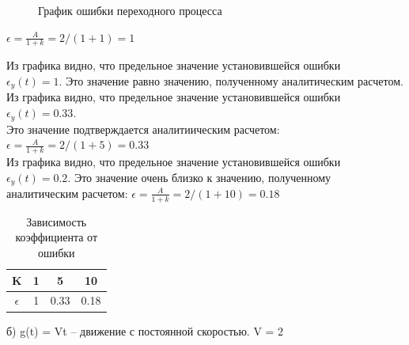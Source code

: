 \documentclass[a4paper, 11pt]{article}
\begin{document}
\begin{figure}[h!]
    \caption{График ошибки переходного процесса}
    \label{tree}
\end{figure}



\large{$\epsilon=\frac {A}{1+k} = 2/(1+1) = 1$}

Из графика видно, что предельное значение установившейся ошибки \\ $\epsilon_y(t) = 1$. Это значение равно значению, полученному аналитическим расчетом.\\

Из графика видно, что предельное значение установившейся ошибки $\epsilon_y(t)=0.33$.\\
Это значение подтверждается аналитиическим расчетом: $\epsilon=\frac {A}{1+k} = 2/(1+5) = 0.33$\\



Из графика видно, что предельное значение установившейся ошибки $\epsilon_y(t)=0.2$.
Это значение очень близко к значению, полученному аналитическим расчетом: $\epsilon=\frac {A}{1+k} = 2/(1+10) = 0.18$

\begin{table}[h]
    \begin{center}
   	\caption{Зависимость коэффициента от ошибки}
    \begin{tabular}{|c|c|c|c|}
    \hline
         K & 1 & 5 & 10 \\
         \hline
         $\epsilon$ & 1 & 0.33 & 0.18 \\
    \hline     
    \end{tabular}

    \label{tab:my_label}
    \end{center}
\end{table}
\newpage
б) g(t) = Vt – движение с постоянной скоростью. V = 2\\
\end{document}
